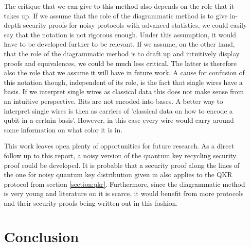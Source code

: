 \documentclass[]{article}
\begin{document}
The critique that we can give to this method also depends on the role that it takes up. If we assume that the role of the diagrammatic method is to give in-depth security proofs for noisy protocols with advanced statistics, we could easily say that the notation is not rigorous enough. Under this assumption, it would have to be developed further to be relevant. If we assume, on the other hand, that the role of the diagrammatic method is to draft up and intuitively display proofs and equivalences, we could be much less critical. The latter is therefore also the role that we assume it will have in future work. A cause for confusion of this notation though, independent of its role, is the fact that single wires have a basis. If we interpret single wires as classical data this does not make sense from an intuitive perspective. Bits are not encoded into bases. A better way to interpret single wires is then as carriers of 'classical data on how to encode a qubit in a certain basis'. However, in this case every wire would carry around some information on what color it is in.    

This work leaves open plenty of opportunities for future research. As a direct follow up to this report, a noisy version of the quantum key recycling security proof could be developed. It is probable that a security proof along the lines of the one for noisy quantum key distribution given in \cite{Kissinger2017} also applies to the QKR protocol from section \ref{section:qkr}. Furthermore, since the diagrammatic method is very young and literature on it is scarce, it would benefit from more protocols and their security proofs being written out in this fashion.

\section{Conclusion}
\end{document}
